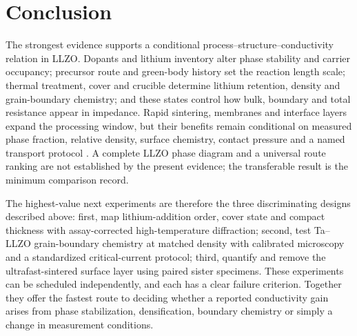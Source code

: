 \section{Conclusion}
\label{sec:conclusion}

The strongest evidence supports a conditional process--structure--conductivity relation in LLZO. Dopants and lithium inventory alter phase stability and carrier occupancy; precursor route and green-body history set the reaction length scale; thermal treatment, cover and crucible determine lithium retention, density and grain-boundary chemistry; and these states control how bulk, boundary and total resistance appear in impedance. Rapid sintering, membranes and interface layers expand the processing window, but their benefits remain conditional on measured phase fraction, relative density, surface chemistry, contact pressure and a named transport protocol \cite{anderson2024comprehensive,heywood2023tailoring,moy2025irreversible,yao2026elimination,zhang2024unveiling,klimpel2023standardizing}. A complete LLZO phase diagram and a universal route ranking are not established by the present evidence; the transferable result is the minimum comparison record.

The highest-value next experiments are therefore the three discriminating designs described above: first, map lithium-addition order, cover state and compact thickness with assay-corrected high-temperature diffraction; second, test Ta--LLZO grain-boundary chemistry at matched density with calibrated microscopy and a standardized critical-current protocol; third, quantify and remove the ultrafast-sintered surface layer using paired sister specimens. These experiments can be scheduled independently, and each has a clear failure criterion. Together they offer the fastest route to deciding whether a reported conductivity gain arises from phase stabilization, densification, boundary chemistry or simply a change in measurement conditions.
